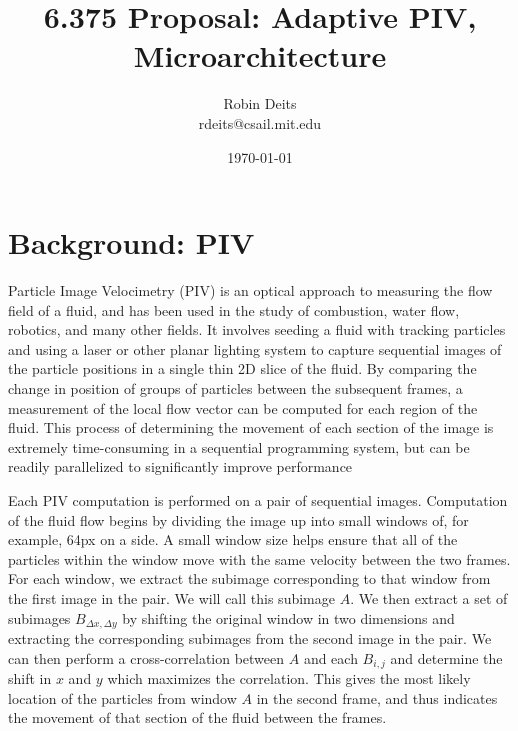 \documentclass{article}
\begin{document}
	\author{Robin Deits\\ rdeits@csail.mit.edu}
	\title{6.375 Proposal: Adaptive PIV, Microarchitecture}
	\date{\today}
	\maketitle

	\tableofcontents

	\section{Background: PIV} %
	\label{sec:background}
	Particle Image Velocimetry (PIV) is an optical approach to measuring the flow field of a fluid, and has been used in the study of combustion, water flow, robotics, and many other fields. It involves seeding a fluid with tracking particles and using a laser or other planar lighting system to capture sequential images of the particle positions in a single thin 2D slice of the fluid. By comparing the change in position of groups of particles between the subsequent frames, a measurement of the local flow vector can be computed for each region of the fluid. This process of determining the movement of each section of the image is extremely time-consuming in a sequential programming system, but can be readily parallelized to significantly improve performance \citep{Yu:2006tb}

	Each PIV computation is performed on a pair of sequential images. Computation of the fluid flow begins by dividing the image up into small windows of, for example, 64px on a side. A small window size helps ensure that all of the particles within the window move with the same velocity between the two frames. For each window, we extract the subimage corresponding to that window from the first image in the pair. We will call this subimage $A$. We then extract a set of subimages $B_{\Delta x,  \Delta y}$ by shifting the original window in two dimensions and extracting the corresponding subimages from the second image in the pair. We can then perform a cross-correlation between $A$ and each $B_{i, j}$ and determine the shift in $x$ and $y$ which maximizes the correlation. This gives the most likely location of the particles from window $A$ in the second frame, and thus indicates the movement of that section of the fluid between the frames.
\end{document}
